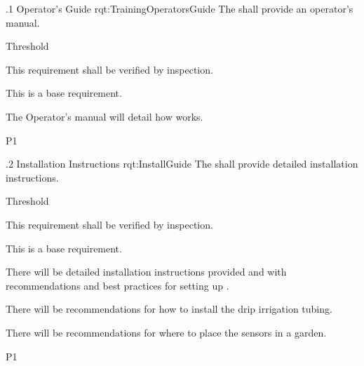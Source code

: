 \ONERQMTV
{\RqtNumberBase.1}
{Operator's Guide}
{rqt:TrainingOperatorsGuide}
{The \ThisSys shall provide an operator's manual.}
{
	\item [All Phases] Threshold
}
{This requirement shall be verified by inspection.}
{
\item [N/A] This is a base requirement.
}
{
	\item The Operator's manual will detail how \ThisSys works.
}
{P1}

\ONERQMTV
{\RqtNumberBase.2}
{Installation Instructions}
{rqt:InstallGuide}
{The \ThisSys shall provide detailed installation instructions.}
{
	\item [All Phases] Threshold
}
{This requirement shall be verified by inspection.}
{
\item [N/A] This is a base requirement.
}
{
	\item There will be detailed installation instructions provided and with recommendations and best practices for setting up \ThisSys.
	\item There will be recommendations for how to install the drip irrigation tubing.
	\item There will be recommendations for where to place the \ThisSys sensors in a garden.
}
{P1}

